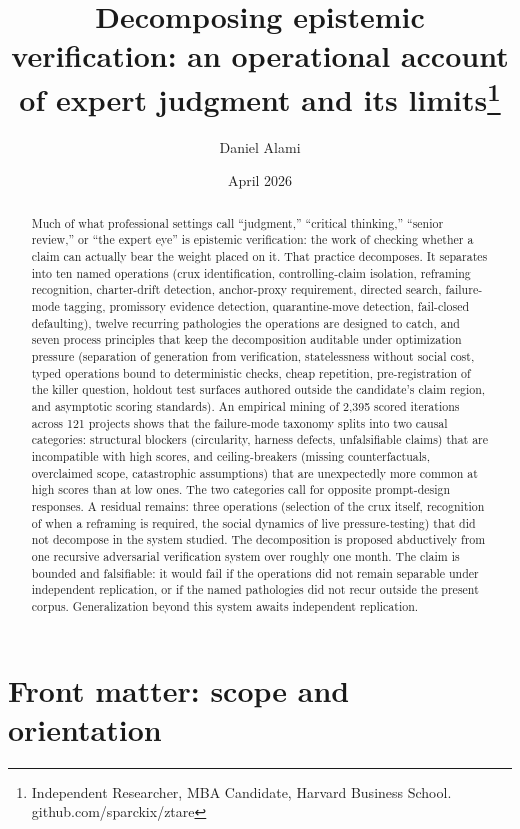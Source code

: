 \documentclass[
  11pt,
]{article}
\title{Decomposing epistemic verification: an operational account of expert judgment and its limits\thanks{Independent
Researcher, MBA Candidate, Harvard Business School.
github.com/sparckix/ztare}}
\author{Daniel Alami}
\date{April 2026}
\begin{document}
\maketitle
\begin{abstract}
Much of what professional settings call ``judgment,'' ``critical
thinking,'' ``senior review,'' or ``the expert eye'' is epistemic
verification: the work of checking whether a claim can actually bear the
weight placed on it. That practice decomposes. It separates into ten
named operations (crux identification, controlling-claim
isolation, reframing recognition, charter-drift detection,
anchor-proxy requirement, directed search, failure-mode tagging,
promissory evidence detection, quarantine-move detection,
fail-closed defaulting), twelve recurring pathologies the operations are
designed to catch, and seven process principles that keep the
decomposition auditable under optimization pressure (separation of
generation from verification, statelessness without social cost, typed
operations bound to deterministic checks, cheap repetition,
pre-registration of the killer question, holdout test surfaces authored
outside the candidate's claim region, and asymptotic scoring standards).
An empirical mining of 2,395 scored iterations across 121 projects shows
that the failure-mode taxonomy splits into two causal categories:
structural blockers (circularity, harness defects, unfalsifiable claims)
that are incompatible with high scores, and ceiling-breakers (missing
counterfactuals, overclaimed scope, catastrophic assumptions) that are
unexpectedly more common at high scores than at low ones. The two
categories call for opposite prompt-design responses. A residual remains:
three operations (selection of the crux itself, recognition of
when a reframing is required, the social dynamics of live
pressure-testing) that did not decompose in the system studied. The
decomposition is proposed abductively from one recursive adversarial
verification system over roughly one month. The claim is
bounded and falsifiable: it would fail if the operations did not remain
separable under independent replication, or if the named pathologies did
not recur outside the present corpus. Generalization beyond this system
awaits independent replication.
\end{abstract}

\section{Front matter: scope and
orientation}\label{front-matter-scope-and-orientation}
\end{document}
